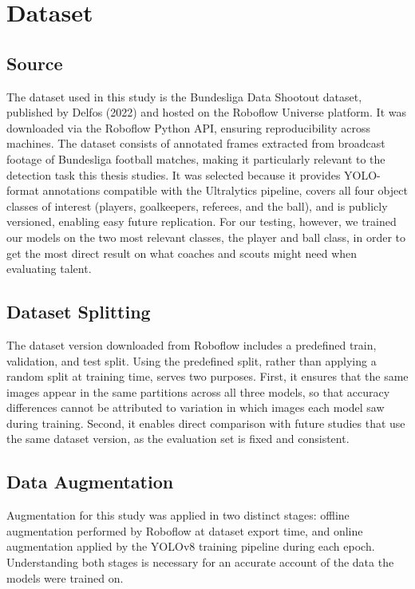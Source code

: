 \section{Dataset}

\subsection{Source}

The dataset used in this study is the Bundesliga Data Shootout dataset, published by Delfos (2022)\cite{RN18} and hosted on the Roboflow Universe platform. It was downloaded via the Roboflow Python API, ensuring reproducibility across machines. The dataset consists of annotated frames extracted from broadcast footage of Bundesliga football matches, making it particularly relevant to the detection task this thesis studies. It was selected because it provides YOLO-format annotations compatible with the Ultralytics pipeline, covers all four object classes of interest (players, goalkeepers, referees, and the ball), and is publicly versioned, enabling easy future replication. For our testing, however, we trained our models on the two most relevant classes, the player and ball class, in order to get the most direct result on what coaches and scouts might need when evaluating talent.

\subsection{Dataset Splitting}
The dataset version downloaded from Roboflow includes a predefined train, validation, and test split. Using the predefined split, rather than applying a random split at training time, serves two purposes. First, it ensures that the same images appear in the same partitions across all three models, so that accuracy differences cannot be attributed to variation in which images each model saw during training. Second, it enables direct comparison with future studies that use the same dataset version, as the evaluation set is fixed and consistent.

\subsection{Data Augmentation}
Augmentation for this study was applied in two distinct stages: offline augmentation performed by Roboflow at dataset export time, and online augmentation applied by the YOLOv8 training pipeline during each epoch. Understanding both stages is necessary for an accurate account of the data the models were trained on. 

